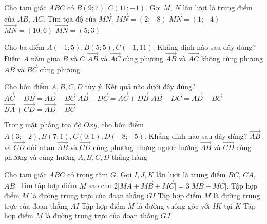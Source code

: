 \begin{ex}%
	Cho tam giác $ABC$ có $B(9;7), C(11;-1)$. Gọi $M$, $N$ lần lượt là trung điểm của $AB$, $AC$. Tìm tọa độ của $\vec{MN}$.
	\choice
	{$\vec{MN}=(2;-8)$}
	{\True $\vec{MN}=(1;-4)$}
	{$\vec{MN}=(10;6)$}
	{$\vec{MN}=(5;3)$}
\end{ex}

\begin{ex}%
	Cho ba điểm $A(-1;5), B(5;5), C(-1,11)$. Khẳng định nào sau đây đúng?
	\choice
	{Điểm $A$ nằm giữa $B$ và $C$}
	{$\vec{AB}$ và $\vec{AC}$ cùng phương}
	{\True $\vec{AB}$ và $\vec{AC}$ không cùng phương}
	{$\vec{AB}$ và $\vec{BC}$ cùng phương}
\end{ex}

\begin{ex}%
	Cho bốn điểm $A, B, C, D$ tùy ý. Kết quả nào dưới đây đúng?
	\choice
	{$\vec{AC}-\vec{DB}=\vec{AD}-\vec{BC}$}
	{$\vec{AB}-\vec{DC}=\vec{AC}+\vec{DB}$}
	{\True $\vec{AB}-\vec{DC}=\vec{AD}-\vec{BC}$}
	{$\vec{BA}+\vec{CD}=\vec{AD}-\vec{BC}$}
\end{ex}

\begin{ex}%
	Trong mặt phẳng tọa độ $Oxy$, cho bốn điểm $A(3;-2), B(7;1), C(0;1), D(-8;-5)$. Khẳng định nào sau đây đúng?
	\choice
	{$\vec{AB}$ và $\vec{CD}$ đối nhau}
	{\True $\vec{AB}$ và $\vec{CD}$ cùng phương nhưng ngược hướng}
	{$\vec{AB}$ và $\vec{CD}$ cùng phương và cùng hướng}
	{$A, B, C, D$ thẳng hàng}
\end{ex}

\begin{ex}%
	Cho tam giác $ABC$ có trọng tâm $G$. Gọi $I, J, K$ lần lượt là trung điểm $BC$, $CA$, $AB$. Tìm tập hợp điểm $M$ sao cho $2\big \vert\vec{MA}+\vec{MB}+\vec{MC}\big \vert=3\big \vert\vec{MB}+\vec{MC}\big \vert.$
	\choice
	{\True Tập hợp điểm $M$ là đường trung trực của đoạn thẳng $GI$}
	{Tập hợp điểm $M$ là đường trung trực của đoạn thẳng $AI$}
	{Tập hợp điểm $M$ là đường vuông góc với $IK$ tại $K$}
	{Tập hợp điểm $M$ là đường trung trực của đoạn thẳng $GJ$}
\end{ex}

